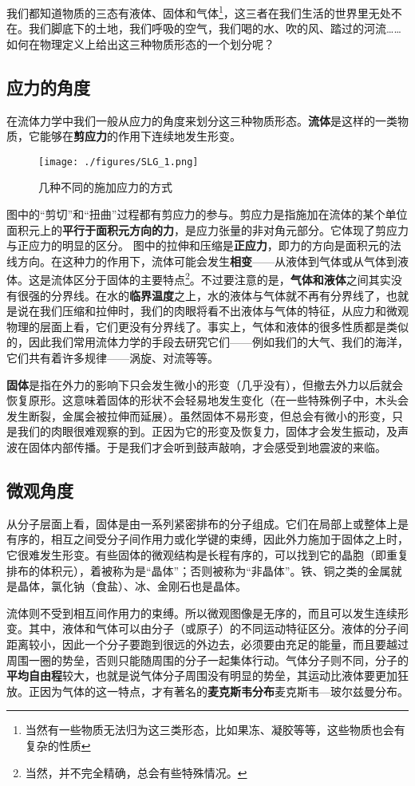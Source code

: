 
我们都知道物质的三态有液体、固体和气体\footnote{当然有一些物质无法归为这三类形态，比如果冻、凝胶等等，这些物质也会有复杂的性质}，这三者在我们生活的世界里无处不在。我们脚底下的土地，我们呼吸的空气，我们喝的水、吹的风、踏过的河流…… 如何在物理定义上给出这三种物质形态的一个划分呢？

\subsection{应力的角度}
在流体力学中我们一般从应力的角度来划分这三种物质形态。\textbf{流体}是这样的一类物质，它能够在\textbf{剪应力}的作用下连续地发生形变。

\begin{figure}[ht]
\centering
\texttt{[image: ./figures/SLG\_1.png]}
\caption{几种不同的施加应力的方式} \label{SLG_fig1}
\end{figure}

图中的“剪切”和“扭曲”过程都有剪应力的参与。剪应力是指施加在流体的某个单位面积元上的\textbf{平行于面积元方向的力}，是应力张量的非对角元部分。它体现了剪应力与正应力的明显的区分。
图中的拉伸和压缩是\textbf{正应力}，即力的方向是面积元的法线方向。在这种力的作用下，流体可能会发生\textbf{相变}——从液体到气体或从气体到液体。这是流体区分于固体的主要特点\footnote{当然，并不完全精确，总会有些特殊情况。}。不过要注意的是，\textbf{气体和液体}之间其实没有很强的分界线。在水的\textbf{临界温度}之上，水的液体与气体就不再有分界线了，也就是说在我们压缩和拉伸时，我们的肉眼将看不出液体与气体的特征，从应力和微观物理的层面上看，它们更没有分界线了。事实上，气体和液体的很多性质都是类似的，因此我们常用流体力学的手段去研究它们——例如我们的大气、我们的海洋，它们共有着许多规律——涡旋、对流等等。

\textbf{固体}是指在外力的影响下只会发生微小的形变（几乎没有），但撤去外力以后就会恢复原形。这意味着固体的形状不会轻易地发生变化（在一些特殊例子中，木头会发生断裂，金属会被拉伸而延展）。虽然固体不易形变，但总会有微小的形变，只是我们的肉眼很难观察的到。正因为它的形变及恢复力，固体才会发生振动，及声波在固体内部传播。于是我们才会听到鼓声敲响，才会感受到地震波的来临。

\subsection{微观角度}
从分子层面上看，固体是由一系列紧密排布的分子组成。它们在局部上或整体上是有序的，相互之间受分子间作用力或化学键的束缚，因此外力施加于固体之上时，它很难发生形变。有些固体的微观结构是长程有序的，可以找到它的晶胞（即重复排布的体积元），着被称为是“晶体”；否则被称为“非晶体”。铁、铜之类的金属就是晶体，氯化钠（食盐）、冰、金刚石也是晶体。

流体则不受到相互间作用力的束缚。所以微观图像是无序的，而且可以发生连续形变。其中，液体和气体可以由分子（或原子）的不同运动特征区分。液体的分子间距离较小，因此一个分子要跑到很远的外边去，必须要由充足的能量，而且要越过周围一圈的势垒，否则只能随周围的分子一起集体行动。气体分子则不同，分子的\textbf{平均自由程}较大，也就是说气体分子周围没有明显的势垒，其运动比液体要更加狂放。正因为气体的这一特点，才有著名的\textbf{麦克斯韦分布}麦克斯韦—玻尔兹曼分布。